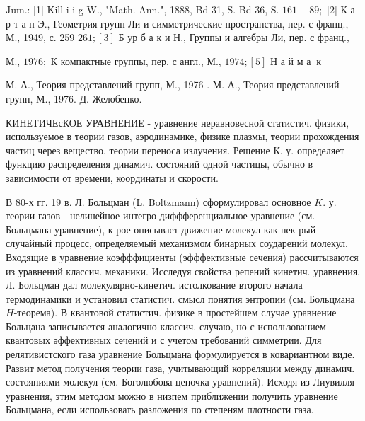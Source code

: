 \documentclass[10pt]{article}
\begin{document}
Jum.: [1] Kill i i g W., "Math. Ann.", 1888, Bd 31, S. Bd 36, S. $161-89 ;$ [2] К а р т а н Э., Геометрия групп Ли и симметрические пространства, пер. с франц., М., 1949, с. 259 $261 ;[3]$ Б ур б а к и Н., Группы и алгебры Ли, пер. с франц.,

М., $1976 ;$ К компактные группы, пер. с англ., М., $1974 ;[5]$ Н а й м а $\mathbf{~ к ~}$

М. А., Теория представлений групп, М., 1976 . М. А., Теория представлений групп, М., 1976. Д. Желобенко.



КИНЕТИЧЕсКОЕ УРАВНЕНИЕ - уравнение неравновесной статистич. физики, используемое в теории газов, аэродинамике, физике плазмы, теории прохождения частиц через вещество, теории переноса излучения. Решение К. у. определяет функцию распределения динамич. состояний одной частицы, обычно в зависимости от времени, координаты и скорости.



В 80-х гг. 19 в. Л. Больцман (L. Boltzmann) сформулировал основное $K$. у. теории газов - нелинейное интегро-диффференциальное уравнение (см. Больцмана уравнение), к-рое описывает движение молекул как нек-рый случайный процесс, определяемый механизмом бинарных соударений молекул. Входящие в уравнение коэфффициенты (эфффективные сечения) рассчитываются из уравнений классич. механики. Исследуя свойства репений кинетич. уравнения, Л. Больцман дал молекулярно-кинетич. истолкование второго начала термодинамики и установил статистич. смысл понятия энтропии (см. Больцмана $H$-теорема). В квантовой статистич. физике в простейшем случае уравнение Больцана записывается аналогично классич. случаю, но с использованием квантовых әффективных сечений и с учетом требований симметрии. Для релятивистского газа уравнение Больцмана формулируется в ковариантном виде. Развит метод получения теории газа, учитывающий корреляции между динамич. состояниями молекул (см. Боголюбова цепочка уравнений). Исходя из Лиувилля уравнения, этим методом можно в низпем приближении получить уравнение Больцмана, если использовать разложения по степеням плотности газа.
\end{document}
